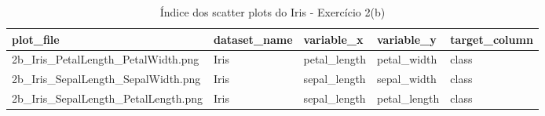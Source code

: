 \begin{table}[htbp]
\centering
\begin{tabular}{lllll}
\hline
plot\_file & dataset\_name & variable\_x & variable\_y & target\_column \\
\hline
2b\_Iris\_PetalLength\_PetalWidth.png & Iris & petal\_length & petal\_width & class \\
2b\_Iris\_SepalLength\_SepalWidth.png & Iris & sepal\_length & sepal\_width & class \\
2b\_Iris\_SepalLength\_PetalLength.png & Iris & sepal\_length & petal\_length & class \\
\hline
\end{tabular}
\caption{Índice dos scatter plots do Iris - Exercício 2(b)}
\label{tab:ex2b-iris-scatter-plot-index}
\end{table}